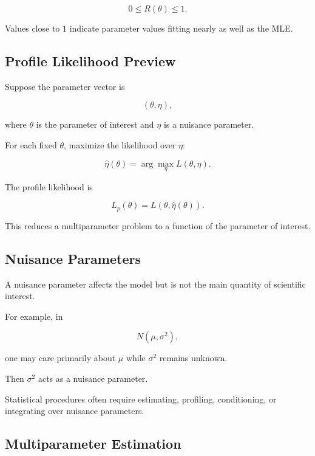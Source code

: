 \[
\boxed{
0\leq R(\theta)\leq1.
}
\]

Values close to \(1\) indicate parameter values fitting nearly as well as
the MLE.

\subsection{Profile Likelihood Preview}
\label{subsec:profile-likelihood-preview}

Suppose the parameter vector is

\[
(\theta,\eta),
\]

where \(\theta\) is the parameter of interest and \(\eta\) is a nuisance
parameter.

For each fixed \(\theta\), maximize the likelihood over \(\eta\):

\[
\widehat{\eta}(\theta)
=
\arg\max_\eta
L(\theta,\eta).
\]

The profile likelihood is

\[
\boxed{
L_p(\theta)
=
L
(
\theta,
\widehat{\eta}(\theta)
).
}
\]

This reduces a multiparameter problem to a function of the parameter of
interest.

\subsection{Nuisance Parameters}
\label{subsec:nuisance-parameters}

A nuisance parameter affects the model but is not the main quantity of
scientific interest.

For example, in

\[
N(\mu,\sigma^2),
\]

one may care primarily about \(\mu\) while \(\sigma^2\) remains unknown.

Then \(\sigma^2\) acts as a nuisance parameter.

Statistical procedures often require estimating, profiling, conditioning,
or integrating over nuisance parameters.

\subsection{Multiparameter Estimation}
\label{subsec:multiparameter-estimation}

